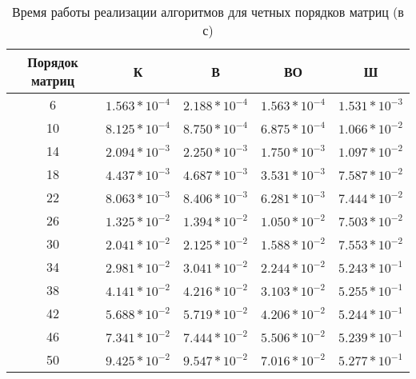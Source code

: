 \begin{table}[h]
	\begin{center}
		\begin{threeparttable}
			\captionsetup{justification=raggedright,singlelinecheck=off}
			\caption{Время работы реализации алгоритмов для четных порядков матриц (в с)}
			\label{tbl:time_measurements_even}
			\begin{tabular}{|c|c|c|c|c|}
				\hline
				Порядок матриц &  К  & В & ВО & Ш \\
				\hline
				6 &$ 1.563* 10^{-4} $&$ 2.188* 10^{-4} $&$ 1.563* 10^{-4} $&$ 1.531* 10^{-3}$\\
				\hline
				10 &$ 8.125* 10^{-4} $&$ 8.750* 10^{-4} $&$ 6.875* 10^{-4} $&$ 1.066* 10^{-2}$\\
				\hline
				14 &$ 2.094* 10^{-3} $&$ 2.250* 10^{-3} $&$ 1.750* 10^{-3} $&$ 1.097* 10^{-2}$\\
				\hline
				18 &$ 4.437* 10^{-3} $&$ 4.687* 10^{-3} $&$ 3.531* 10^{-3} $&$ 7.587* 10^{-2}$\\
				\hline
				22 &$ 8.063* 10^{-3} $&$ 8.406* 10^{-3} $&$ 6.281* 10^{-3} $&$ 7.444* 10^{-2}$\\
				\hline
				26 &$ 1.325* 10^{-2} $&$ 1.394* 10^{-2} $&$ 1.050* 10^{-2} $&$ 7.503* 10^{-2}$\\
				\hline
				30 &$ 2.041* 10^{-2} $&$ 2.125* 10^{-2} $&$ 1.588* 10^{-2} $&$ 7.553* 10^{-2}$\\
				\hline
				34 &$ 2.981* 10^{-2} $&$ 3.041* 10^{-2} $&$ 2.244* 10^{-2} $&$ 5.243* 10^{-1}$\\
				\hline
				38 &$ 4.141* 10^{-2} $&$ 4.216* 10^{-2} $&$ 3.103* 10^{-2} $&$ 5.255* 10^{-1}$\\
				\hline
				42 &$ 5.688* 10^{-2} $&$ 5.719* 10^{-2} $&$ 4.206* 10^{-2} $&$ 5.244* 10^{-1}$\\
				\hline
				46 &$ 7.341* 10^{-2} $&$ 7.444* 10^{-2} $&$ 5.506* 10^{-2} $&$ 5.239* 10^{-1}$\\
				\hline
				50 &$ 9.425* 10^{-2} $&$ 9.547* 10^{-2} $&$ 7.016* 10^{-2} $&$ 5.277* 10^{-1}$\\
				\hline
			\end{tabular}
		\end{threeparttable}
	\end{center}
\end{table}

